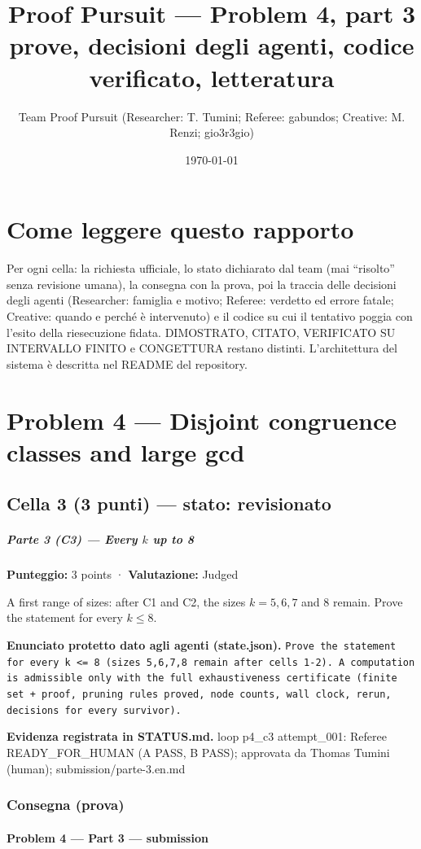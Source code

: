 \documentclass[11pt,a4paper]{article}
\title{Proof Pursuit --- Problem 4, part 3\\ \large prove, decisioni degli agenti, codice verificato, letteratura}
\author{Team Proof Pursuit (Researcher: T. Tumini; Referee: gabundos; Creative: M. Renzi; gio3r3gio)}
\date{\today}
\begin{document}
\maketitle\tableofcontents
\section*{Come leggere questo rapporto}
Per ogni cella: la richiesta ufficiale, lo stato dichiarato dal team (mai ``risolto'' senza revisione umana), la consegna
con la prova, poi la traccia delle decisioni degli agenti (Researcher: famiglia e motivo; Referee: verdetto ed errore
fatale; Creative: quando e perché è intervenuto) e il codice su cui il tentativo poggia con l'esito della riesecuzione
fidata. DIMOSTRATO, CITATO, VERIFICATO SU INTERVALLO FINITO e CONGETTURA restano distinti. L'architettura del sistema
è descritta nel README del repository.
\section{Problem 4 — Disjoint congruence classes and large gcd}
\subsection{Cella 3 (3 punti) — stato: revisionato}
\subparagraph{\texorpdfstring{Parte 3 (C3) --- Every \(k\) up to
8}{Parte 3 (C3) --- Every k up to 8}}\label{parte-3-c3-every-k-up-to-8}

\textbf{Punteggio:} 3 points · \textbf{Valutazione:} Judged

A first range of sizes: after C1 and C2, the sizes \(k = 5, 6, 7\) and
\(8\) remain. Prove the statement for every \(k \le 8\).

\textbf{Enunciato protetto dato agli agenti (state.json).} \texttt{Prove the statement for every k \textless{}= 8 (sizes 5,6,7,8 remain after cells 1-2). A computation is admissible only with the full exhaustiveness certificate (finite set + proof, pruning rules proved, node counts, wall clock, rerun, decisions for every survivor).}

\textbf{Evidenza registrata in STATUS.md.} loop p4\_c3 attempt\_001: Referee READY\_FOR\_HUMAN (A PASS, B PASS); approvata da Thomas Tumini (human); submission/parte-3.en.md

\subsubsection{Consegna (prova)}
\paragraph{Problem 4 --- Part 3 ---
submission}\label{problem-4-part-3-submission}
\end{document}
